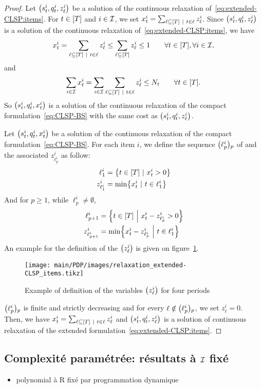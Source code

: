 \begin{proof}
Let $\bracket{\inventory_t^i, \quantity_t^i, z_{\ell}^i}$ be a solution of the continuous relaxation of~\eqref{eq:extended-CLSP:items}.
For $t\in\range{\horizon}$ and $i\in\mathcal{I}$, we set $\setup_t^i=\sum_{\ell\subseteq\range{\horizon}~|~t\in\ell} z_{\ell}^i$.
Since $\bracket{\inventory_t^i, \quantity_t^i, z_{\ell}^i}$ is a solution of the continuous relaxation of~\eqref{eq:extended-CLSP:items}, we have
$$
\setup_t^i
= \sum_{\ell\subseteq\range{\horizon}~|~t\in\ell} z_{\ell}^i
\le \sum_{\ell\subseteq\range{\horizon}} z_{\ell}^i
\le 1
\qquad \forall t\in\range{\horizon},\forall i\in\REF,
$$
and
$$
\sum_{i\in\REF}\setup_t^i
= \sum_{i\in\REF}\sum_{\ell\subseteq\range{\horizon}~|~t\in\ell} z_{\ell}^i
\le \nbsetups_t
\qquad \forall t\in\range{\horizon}.
$$
So $\bracket{\inventory_t^i, \quantity_t^i, \setup_t^i}$  is a solution of the continuous relaxation of the compact formulation~\eqref{eq:CLSP-BS} with the same cost as $\bracket{\inventory_t^i, \quantity_t^i, z_{\ell}^i}$.


Let $\bracket{\inventory_t^i, \quantity_t^i, \setup_t^i}$ be a solution of the continuous relaxation of the compact formulation~\eqref{eq:CLSP-BS}. For each item $i$, we define the sequence $\bracket{\ell_p^i}_p$ of and the associated $z_{\ell_p^i}^i$ as follow:
$$
\begin{aligned}
\ell_1^i       &= \crbracket{t\in\range{\horizon}~|~\setup_t^i>0} \\
z_{\ell_1^i}^i &= \min\crbracket{\setup_t^i~|~t\in\ell_1^i}
\end{aligned}
$$
And for $p\ge1$, while $\ell_p^i\ne\emptyset$,
$$
\begin{aligned}
\ell_{p+1}^i       &= \crbracket{t\in\range{\horizon}~\Big|~\setup_t^i-z_{\ell_p^i}^i>0} \\
z_{\ell_{p+1}^i}^i &= \min\crbracket{\setup_t^i-z_{\ell_p^i}^i~\Big|~t\in\ell_1^i}
\end{aligned}
$$
An example for the definition of the $\bracket{z_{\ell}^i}$ is given on figure~\ref{fig:relaxation-extended-formulation-by-reference}.

\begin{figure}[h]
  \centering
  \texttt{[image: main/PDP/images/relaxation\_extended-CLSP\_items.tikz]}
  \caption{Example of definition of the variables $\bracket{z_{\ell}^i}$ for four periods}
  \label{fig:relaxation-extended-formulation-by-reference}
\end{figure}

$\bracket{\ell_p^i}_p$ is finite and strictly decreasing and for every $\ell\notin\bracket{\ell_p^i}_p$, we set $z_{\ell}^i=0$. Then, we have $\setup_t^i = \sum_{\ell\subseteq\range{\horizon}~|~t\in\ell} z_{\ell}^i$ and $\bracket{\inventory_t^i, \quantity_t^i, z_{\ell}^i}$ is a solution of continuous relaxation of the extended formulation~\eqref{eq:extended-CLSP:items}.
\end{proof}



\subsection{Complexité paramétrée: résultats à $\mathcal{I}$ fixé}


\begin{itemize}
  \item polynomial à R fixé par programmation dynamique
\end{itemize}
